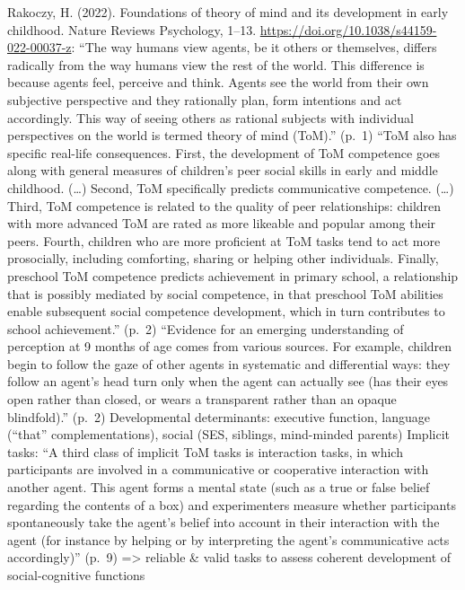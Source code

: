 \documentclass[
  man,floatsintext]{apa6}
\begin{document}
Rakoczy, H. (2022). Foundations of theory of mind and its development in early childhood. Nature Reviews Psychology, 1--13. \url{https://doi.org/10.1038/s44159-022-00037-z}:
``The way humans view agents, be it others or themselves, differs radically from the way humans view the rest of the world. This difference is because agents feel, perceive and think. Agents see the world from their own subjective perspective and they rationally plan, form intentions and act accordingly. This way of seeing others as rational subjects with individual perspectives on the world is termed theory of mind (ToM).'' (p.~1)
``ToM also has specific real-life consequences. First, the development of ToM competence goes along with general measures of children's peer social skills in early and middle childhood. (\ldots) Second, ToM specifically predicts communicative competence. (\ldots) Third, ToM competence is related to the quality of peer relationships: children with more advanced ToM are rated as more likeable and popular among their peers. Fourth, children who are more proficient at ToM tasks tend to act more prosocially, including comforting, sharing or helping other individuals. Finally, preschool ToM competence predicts achievement in primary school, a relationship that is possibly mediated by social competence, in that preschool ToM abilities enable subsequent social competence development, which in turn contributes to school achievement.'' (p.~2)
``Evidence for an emerging understanding of perception at 9 months of age comes from various sources. For example, children begin to follow the gaze of other agents in systematic and differential ways: they follow an agent's head turn only when the agent can actually see (has their eyes open rather than closed, or wears a transparent rather than an opaque blindfold).'' (p.~2)
Developmental determinants: executive function, language (``that'' complementations), social (SES, siblings, mind-minded parents)
Implicit tasks: ``A third class of implicit ToM tasks is interaction tasks, in which participants are involved in a communicative or cooperative interaction with another agent. This agent forms a mental state (such as a true or false belief regarding the contents of a box) and experimenters measure whether participants spontaneously take the agent's belief into account in their interaction with the agent (for instance by helping or by interpreting the agent's communicative acts accordingly)'' (p.~9)
=\textgreater{} reliable \& valid tasks to assess coherent development of social-cognitive functions
\end{document}

